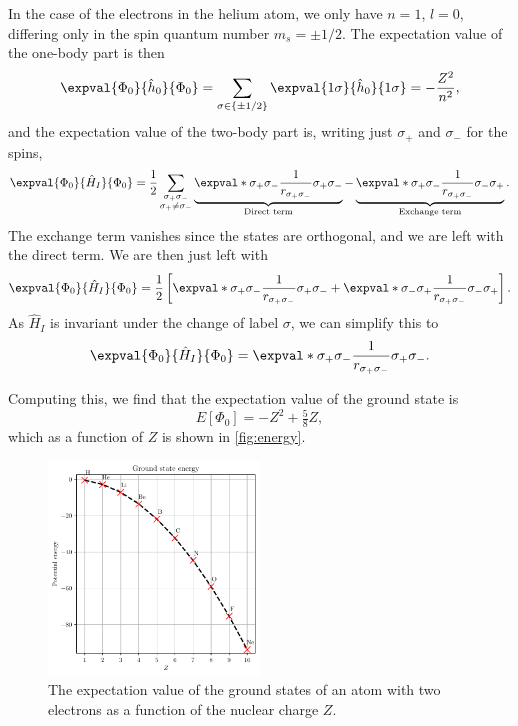 In the case of the electrons in the helium atom, we only have $n = 1$, $l = 0$, differing only in the spin quantum number $m_s = \pm 1/2$.
The expectation value of the one-body part is then
\begin{equation*}
    \expval{\Phi_0}{\hat{h}_0}{\Phi_0} = \sum_{\sigma \in \{\pm 1/2\}} \expval{1\sigma}{\hat{h}_0}{1\sigma} = -\frac{Z^2}{n^2},
\end{equation*}
and the expectation value of the two-body part is, writing just $\sigma_{+}$ and $\sigma_{-}$ for the spins,
\begin{equation*}
    \expval{\Phi_0}{\hat{H}_I}{\Phi_0}
    = \frac{1}{2} \sum_{\substack{\sigma_{+}\sigma_{-}\\ \sigma_{+} \neq \sigma_{-}}}
    \underbrace{\expval*{\sigma_{+} \sigma_{-}}{\frac{1}{r_{\sigma_{+}\sigma_{-}}}}{\sigma_{+} \sigma_{-}}}_{\textnormal{Direct term}}
    - \underbrace{\expval*{\sigma_{+} \sigma_{-}}{\frac{1}{r_{\sigma_{+}\sigma_{-}}}}{\sigma_{-}\sigma_{+}}}_{\textnormal{Exchange term}}.
\end{equation*}
The exchange term vanishes since the states are orthogonal, and we are left with the direct term.
We are then just left with
\begin{equation*}
    \expval{\Phi_0}{\hat{H}_I}{\Phi_0} = \frac{1}{2}\left[ \expval*{\sigma_{+} \sigma_{-}}{\frac{1}{r_{\sigma_{+} \sigma_{-}}}}{\sigma_{+} \sigma_{-}} + \expval*{\sigma_{-} \sigma_{+}}{\frac{1}{r_{\sigma_{+} \sigma_{-}}}}{\sigma_{-} \sigma_{+}}\right].
\end{equation*}
As $\hat{H}_I$ is invariant under the change of label $\sigma$, we can simplify this to
\begin{equation*}
    \expval{\Phi_0}{\hat{H}_I}{\Phi_0} = \expval*{\sigma_{+} \sigma_{-}}{\frac{1}{r_{\sigma_{+} \sigma_{-}}}}{\sigma_{+} \sigma_{-}}.
\end{equation*}

Computing this, we find that the expectation value of the ground state is
\begin{equation}
    E[\Phi_0] = -Z^2 + \tfrac{5}{8}Z,
\end{equation}
which as a function of $Z$ is shown in \autoref{fig:energy}.

\begin{figure}[ht]
    \centering
    \includegraphics[width=0.5\textwidth]{figs/energy_plot.pdf}
    \caption{The expectation value of the ground states of an atom with two electrons as a function of the nuclear charge $Z$.\label{fig:energy}}
\end{figure}
